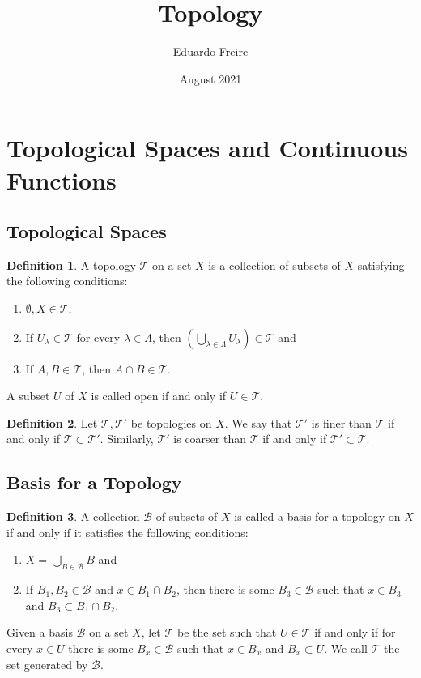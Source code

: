 \documentclass{article}
\title{Topology}
\author{Eduardo Freire}
\date{August 2021}
\theoremstyle{definition}
\newtheorem{definition}{Definition}[subsection]
\theoremstyle{remark}
\newcommand{\paren}[1]{\left( #1 \right)}
\newcommand{\prt}[1]{\mathcal{#1}}
\begin{document}
\maketitle

\setcounter{section}{1}
\section{Topological Spaces and Continuous Functions}

\setcounter{subsection}{11}
\subsection{Topological Spaces}


\begin{definition}\label{def_topology}
    A topology $\prt{T}$ on a set $X$ is a collection of subsets of $X$ satisfying the following conditions: 
    
    \begin{enumerate}
        \item $\emptyset, X \in \prt{T}$,
        \item If $U_\lambda \in \prt{T}$ for every $\lambda \in \Lambda$, then $\paren{\bigcup_{\lambda \in \Lambda} U_\lambda} \in \prt{T}$ and
        \item If $A, B \in \prt{T}$, then $A \cap B \in \prt{T}$.
    \end{enumerate}
    A subset $U$ of $X$ is called open if and only if $U \in \prt{T}$.
\end{definition}

\begin{definition}
    Let $\prt{T}, \prt{T'}$ be topologies on $X$. We say that $\prt{T'}$ is finer than $\prt{T}$ if and only if $\prt{T} \subset \prt{T'}$. Similarly, $\prt{T'}$ is coarser than $\prt{T}$ if and only if $\prt{T'} \subset \prt{T}$. 
\end{definition}

\subsection{Basis for a Topology}

\begin{definition}\label{def_basis}
    A collection $\prt{B}$ of subsets of $X$ is called a basis for a topology on $X$ if and only if it satisfies the following conditions:
    \begin{enumerate}
        \item $X = \bigcup_{B \in \prt{B}} B$ and
        \item If $B_1, B_2 \in \prt{B}$ and $x \in B_1 \cap B_2$, then there is some $B_3 \in \prt{B}$ such that $x \in B_3$ and $B_3 \subset B_1 \cap B_2$.
    \end{enumerate}
    Given a basis $\prt{B}$ on a set $X$, let $\prt{T}$ be the set such that $U \in \prt{T}$ if and only if for every $x \in U$ there is some $B_x \in \prt{B}$ such that $x \in B_x$ and $B_x \subset U$. We call $\prt{T}$ the set generated by $\prt{B}$.
\end{definition}
\end{document}
